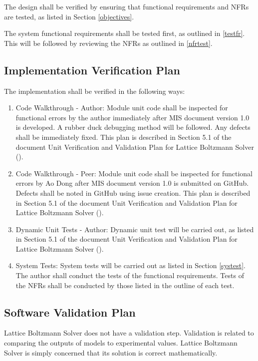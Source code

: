 \documentclass[12pt, titlepage]{article}
\newcommand{\famname}{Lattice Boltzmann Solver}
\begin{document}
The design shall be verified by ensuring that functional requirements and NFRs
are tested, as listed in Section \ref{objectives}.

\noindent The system functional requirements shall be tested first, as outlined
in \ref{testfr}. This will be followed by reviewing the NFRs as outlined in
\ref{nfrtest}.

\subsection{Implementation Verification Plan}
  
\noindent The implementation shall be verified in the following ways:

\begin{enumerate}
\item Code Walkthrough - Author: Module unit code shall be inspected for
  functional errors by the author immediately after MIS document version 1.0 is
  developed. A rubber duck debugging method will be followed. Any defects shall
  be immediately fixed. This plan is described in Section 5.1 of the document
  Unit Verification and Validation Plan for Lattice Boltzmann Solver
  (\citet{LBM_UVNV_PM}).
\item Code Walkthrough - Peer: Module unit code shall be inspected for
  functional errors by Ao Dong after MIS document version 1.0 is submitted on
  GitHub. Defects shall be noted in GitHub using issue creation. This plan is
  described in Section 5.1 of the document Unit Verification and Validation Plan
  for Lattice Boltzmann Solver (\citet{LBM_UVNV_PM}).
\item Dynamic Unit Tests - Author: Dynamic unit test will be carried out, as
  listed in Section 5.1 of the document Unit Verification and Validation Plan
  for Lattice Boltzmann Solver (\citet{LBM_UVNV_PM}).
\item System Tests: System tests will be carried out as listed in Section
  \ref{systest}. The author shall conduct the tests of the functional
  requirements. Tests of the NFRs shall be conducted by those listed in the
  outline of each test.
\end{enumerate}

\subsection{Software Validation Plan}

{\famname} does not have a validation step. Validation is related to comparing the outputs of models to experimental values. {\famname} is simply concerned that its solution is correct mathematically.
\end{document}

